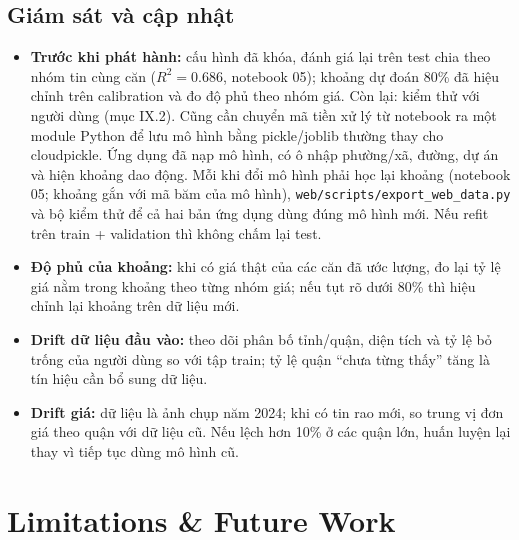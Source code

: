 \documentclass[11pt]{article}
\begin{document}
\subsection{Giám sát và cập nhật}

\begin{itemize}
    \item \textbf{Trước khi phát hành:} cấu hình đã khóa, đánh giá lại trên test chia theo nhóm tin cùng căn
          ($R^2 = 0.686$, notebook 05); khoảng dự đoán 80\% đã hiệu chỉnh trên calibration và đo độ phủ theo nhóm giá.
          Còn lại: kiểm thử với người dùng (mục IX.2). Cũng cần
          chuyển mã tiền xử lý từ notebook ra một module Python để lưu mô hình bằng pickle/joblib thường thay cho cloudpickle. Ứng dụng đã nạp mô
          hình, có ô nhập phường/xã, đường, dự án và hiện khoảng dao động. Mỗi khi đổi mô hình phải học lại khoảng
          (notebook 05; khoảng gắn với mã băm của mô hình), \nolinkurl{web/scripts/export_web_data.py} và bộ kiểm thử để cả hai
          bản ứng dụng dùng đúng mô hình mới. Nếu refit trên train + validation thì không chấm lại test.
    \item \textbf{Độ phủ của khoảng:} khi có giá thật của các căn đã ước lượng, đo lại tỷ lệ giá nằm trong khoảng
          theo từng nhóm giá; nếu tụt rõ dưới 80\% thì hiệu chỉnh lại khoảng trên dữ liệu mới.
    \item \textbf{Drift dữ liệu đầu vào:} theo dõi phân bố tỉnh/quận, diện tích và tỷ lệ bỏ trống của người
          dùng so với tập train; tỷ lệ quận ``chưa từng thấy'' tăng là tín hiệu cần bổ sung dữ liệu.
    \item \textbf{Drift giá:} dữ liệu là ảnh chụp năm 2024; khi có tin rao mới, so trung vị đơn giá theo quận
          với dữ liệu cũ. Nếu lệch hơn 10\% ở các quận lớn, huấn luyện lại thay vì tiếp tục dùng mô hình cũ.
\end{itemize}

\section{Limitations \& Future Work}
\end{document}
